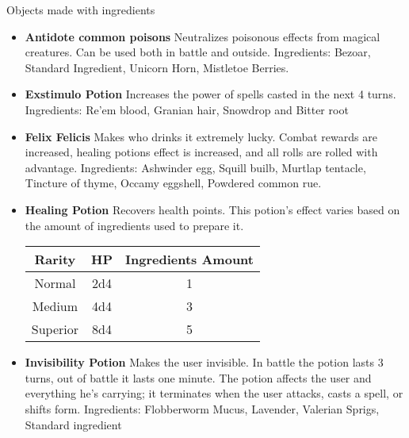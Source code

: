 Objects made with ingredients\\

\begin{itemize}
    \item \textbf{Antidote common poisons}
 Neutralizes poisonous effects from magical creatures. Can be used both in battle and outside.
 Ingredients: Bezoar, Standard Ingredient, Unicorn Horn, Mistletoe Berries.
    
    \item \textbf{Exstimulo Potion}
Increases the power of spells casted in the next 4 turns.
Ingredients: Re'em blood, Granian hair, Snowdrop and Bitter root

    \item \textbf{Felix Felicis}
Makes who drinks it extremely lucky. Combat rewards are increased, healing potions effect is increased, and all rolls are rolled with advantage.
Ingredients: Ashwinder egg, Squill builb, Murtlap tentacle, Tincture of thyme, Occamy eggshell, Powdered common rue.
    
	\item \textbf{Healing Potion}
 Recovers health points. This potion's effect varies based on the amount of ingredients used to prepare it.

\begin{tabular}{ |c|c|c } 
\hline
\textbf{Rarity} & \textbf{HP}  & \textbf{Ingredients Amount} \\
\hline
Normal  & 2d4  & 1  \\
\hline
Medium  & 4d4 & 3 \\
\hline
Superior  & 8d4 & 5 \\
\hline
\end{tabular}


	 \item \textbf{Invisibility Potion}
Makes the user invisible. In battle the potion lasts 3 turns, out of battle it lasts one minute. The potion affects the user and everything he's carrying; it terminates when the user attacks, casts a spell, or shifts form.
Ingredients: Flobberworm Mucus, Lavender, Valerian Sprigs, Standard ingredient
\end{itemize}
\pagebreak